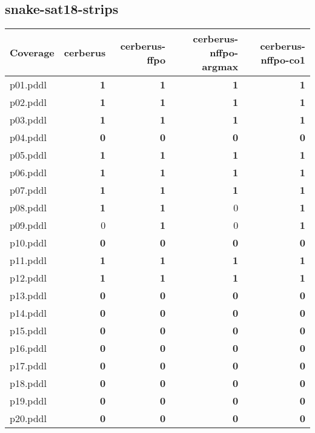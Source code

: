 \documentclass{article}
\begin{document}
\hypertarget{coverage-snake-sat18-strips}{}
\subsection*{snake-sat18-strips}

\begin{tabular}{@{}lrrrr@{}}
Coverage & cerberus & cerberus-ffpo & cerberus-nffpo-argmax & cerberus-nffpo-co1 \\
\midrule
p01.pddl & \textbf{1} & \textbf{1} & \textbf{1} & \textbf{1} \\
p02.pddl & \textbf{1} & \textbf{1} & \textbf{1} & \textbf{1} \\
p03.pddl & \textbf{1} & \textbf{1} & \textbf{1} & \textbf{1} \\
p04.pddl & \textbf{0} & \textbf{0} & \textbf{0} & \textbf{0} \\
p05.pddl & \textbf{1} & \textbf{1} & \textbf{1} & \textbf{1} \\
p06.pddl & \textbf{1} & \textbf{1} & \textbf{1} & \textbf{1} \\
p07.pddl & \textbf{1} & \textbf{1} & \textbf{1} & \textbf{1} \\
p08.pddl & \textbf{1} & \textbf{1} & 0 & \textbf{1} \\
p09.pddl & 0 & \textbf{1} & 0 & \textbf{1} \\
p10.pddl & \textbf{0} & \textbf{0} & \textbf{0} & \textbf{0} \\
p11.pddl & \textbf{1} & \textbf{1} & \textbf{1} & \textbf{1} \\
p12.pddl & \textbf{1} & \textbf{1} & \textbf{1} & \textbf{1} \\
p13.pddl & \textbf{0} & \textbf{0} & \textbf{0} & \textbf{0} \\
p14.pddl & \textbf{0} & \textbf{0} & \textbf{0} & \textbf{0} \\
p15.pddl & \textbf{0} & \textbf{0} & \textbf{0} & \textbf{0} \\
p16.pddl & \textbf{0} & \textbf{0} & \textbf{0} & \textbf{0} \\
p17.pddl & \textbf{0} & \textbf{0} & \textbf{0} & \textbf{0} \\
p18.pddl & \textbf{0} & \textbf{0} & \textbf{0} & \textbf{0} \\
p19.pddl & \textbf{0} & \textbf{0} & \textbf{0} & \textbf{0} \\
p20.pddl & \textbf{0} & \textbf{0} & \textbf{0} & \textbf{0} \\
\end{tabular}
\end{document}
